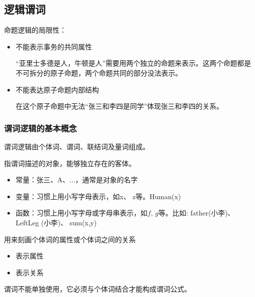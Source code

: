 \subsection{逻辑谓词}
\begin{note}
    命题逻辑的局限性：
    \begin{itemize}
        \item 不能表示事务的共同属性
        
        “亚里士多德是人，牛顿是人”需要用两个独立的命题来表示。这两个命题都是不可拆分的原子命题，两个命题共同的部分没法表示。
        \item 不能表达原子命题内部结构
        
        在这个原子命题中无法“张三和李四是同学”体现张三和李四的关系。
    \end{itemize}
\end{note}
\subsubsection{谓词逻辑的基本概念}
谓词逻辑由个体词、谓词、联结词及量词组成。
\begin{definition}[个体词（项）]
    指谓词描述的对象，能够独立存在的客体。

    \begin{itemize}
        \item \textcolor{main1}{常量：}张三、A、$\dots$，通常是对象的名字
        \item \textcolor{main1}{变量：}习惯上用小写字母表示，如x、 z等。Human(x)
        \item \textcolor{main1}{函数：}习惯上用小写字母或字母串表示，如$f,\,g$等。比如: father(小李)、LeftLeg (小李)、 sum(x,y)
    \end{itemize}
\end{definition}
\begin{definition}[谓词]
    用来刻画个体词的\textcolor{main1}{属性}或个体词之间的\textcolor{main1}{关系}
    
    \begin{itemize}
        \item 表示属性
        \item 表示关系
    \end{itemize}

    谓词不能单独使用，它必须与个体词结合才能构成谓词公式。
\end{definition}

